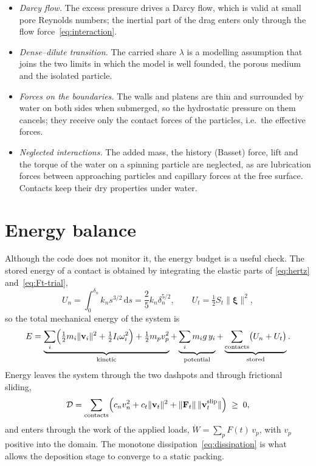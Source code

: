 \begin{itemize}[leftmargin=1.6em]
  \item \emph{Darcy flow.}  The excess pressure drives a Darcy flow, which is
        valid at small pore Reynolds numbers; the inertial part of the drag
        enters only through the flow force~\eqref{eq:interaction}.
  \item \emph{Dense--dilute transition.}  The carried share $\lambda$ is a
        modelling assumption that joins the two limits in which the model is
        well founded, the porous medium and the isolated particle.
  \item \emph{Forces on the boundaries.}  The walls and platens are thin and
        surrounded by water on both sides when submerged, so the hydrostatic
        pressure on them cancels; they receive only the contact forces of the
        particles, i.e.\ the effective forces.
  \item \emph{Neglected interactions.}  The added mass, the history (Basset)
        force, lift and the torque of the water on a spinning particle are
        neglected, as are lubrication forces between approaching particles and
        capillary forces at the free surface.  Contacts keep their dry
        properties under water.
\end{itemize}

\section{Energy balance}
\label{sec:energy}

Although the code does not monitor it, the energy budget is a useful check.  The
stored energy of a contact is obtained by integrating the elastic parts of
\eqref{eq:hertz} and~\eqref{eq:Ft-trial},
\begin{equation}
  U_{n} = \int_{0}^{\delta_{n}} k_{n}s^{3/2}\,\mathrm{d}s
        = \frac{2}{5}k_{n}\delta_{n}^{5/2},
  \qquad
  U_{t} = \tfrac{1}{2}S_{t}\lVert\boldsymbol{\xi}\rVert^{2},
  \label{eq:strain-energy}
\end{equation}
so the total mechanical energy of the system is
\begin{equation}
  E =
  \underbrace{\sum_{i}\Bigl(\tfrac{1}{2}m_{i}\lVert\mathbf{v}_{i}\rVert^{2}
                          + \tfrac{1}{2}I_{i}\omega_{i}^{2}\Bigr)
              + \tfrac{1}{2}m_{p}v_{p}^{2}}_{\text{kinetic}}
  + \underbrace{\sum_{i} m_{i}g\,y_{i}}_{\text{potential}}
  + \underbrace{\sum_{\text{contacts}} \bigl(U_{n}+U_{t}\bigr)}_{\text{stored}} .
  \label{eq:energy}
\end{equation}
Energy leaves the system through the two dashpots and through frictional
sliding,
\begin{equation}
  \mathcal{D}
  = \sum_{\text{contacts}}
    \Bigl(
      c_{n}v_{n}^{2}
      + c_{t}\lVert\mathbf{v}_{t}\rVert^{2}
      + \lVert\mathbf{F}_{t}\rVert\,
        \lVert\mathbf{v}_{t}^{\text{slip}}\rVert
    \Bigr) \;\ge\; 0 ,
  \label{eq:dissipation}
\end{equation}
and enters through the work of the applied loads, $\dot W = \sum_{p} F(t)\,v_{p}$,
with $v_{p}$ positive into the domain.
The monotone dissipation~\eqref{eq:dissipation} is what allows the deposition
stage to converge to a static packing.

